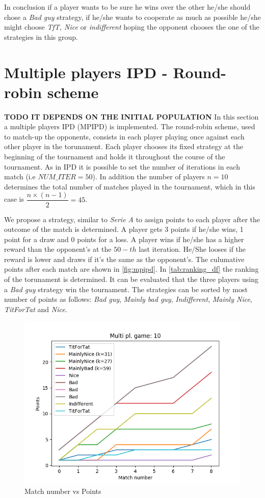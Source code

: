 \documentclass[journal,a4paper,10pt,twoside]{IEEEtran}
\begin{document}
In conclusion if a player wants to be sure he wins over the other he/she should chose a \textit{Bad guy} strategy, if he/she wants to cooperate as much as possible he/she might choose \textit{TfT, Nice} or \textit{indifferent} hoping the opponent chooses the one of the strategies in this group.     

\newpage

\section{Multiple players IPD - Round-robin scheme} \label{IPDMP}
\textbf{TODO IT DEPENDS ON THE INITIAL POPULATION}
In this section a multiple players IPD (MPIPD) is implemented. The round-robin scheme, used to match-up the opponents, consists in each player playing once against each other player in the torunament.
Each player chooses its fixed strategy at the beginning of the tournament and holds it throughout the course of the tournament.
As in IPD it is possible to set the number of iterations in each match (i.e $NUM\_ITER = 50$). In addition the number of players $n = 10$ determines the total number of matches played in the tournament, which in this case is $\dfrac{n \times (n-1)}{2} = 45$.

We propose a strategy, similar to \textit{Serie A} to assign points to each player after the outcome of the match is determined. A player gets 3 points if he/she wins, 1 point for a draw and 0 points for a loss. A player wins if he/she has a higher reward than the opponent's at the $50-th$ last iteration. He/She looses if the reward is lower and draws if it's the same as the opponent's.
The culumative points after each match are shown in \autoref{fig:mpipd}.
In \autoref{tab:ranking_df} the ranking of the torunament is determined. It can be evaluated that the three players using a \textit{Bad guy} strategy win the tournament.
The strategies can be sorted by most number of points as follows: \textit{Bad guy}, \textit{Mainly bad guy}, \textit{Indifferent}, \textit{Mainly Nice}, \textit{TitForTat} and \textit{Nice}.

\begin{figure}
    \centering
    \includegraphics[width=1\columnwidth]{../img_v1/idpmp-scores-10.png}
    \caption{Match number vs Points}
    \label{fig:mpipd}
\end{figure}
\end{document}
